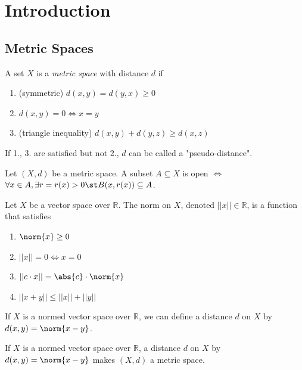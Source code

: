 \section{Introduction}
\subsection{Metric Spaces}

\begin{definition}
    A set $X$ is a \emph{metric space} with distance $d$ if 
    \begin{enumerate}
        \item (symmetric) $d(x, y) = d(y, x) \geq 0$
        \item $d(x, y) = 0 \iff x = y$
        \item (triangle inequality) $d(x,y) + d(y, z) \geq d(x, z)$
    \end{enumerate}
\end{definition}

\begin{remark}
    If 1., 3. are satisfied but not 2., $d$ can be called a "pseudo-distance".
\end{remark}

\begin{definition}
    Let $(X, d)$ be a metric space. A subset $A \subseteq X$ is open $\iff$ $\forall x \in A, \exists r = r(x )> 0 \st B(x, r(x)) \subseteq A$.
\end{definition}

\begin{definition}
    Let $X$ be a vector space over $\mathbb{R}$. The norm on $X$, denoted $||x|| \in \mathbb{R}$, is a function that satisfies 
    \begin{enumerate}
        \item $\norm{x} \geq 0$
        \item $||x|| = 0 \iff x = 0$
        \item $||c \cdot x|| = \abs{c} \cdot \norm{x}$
        \item $||x+y|| \leq ||x|| + ||y||$
    \end{enumerate}
    If $X$ is a normed vector space over $\mathbb{R}$, we can define a distance $d$ on $X$ by $d(x,y) = \norm{x - y}$.
\end{definition}

\begin{proposition}
    If $X$ is a normed vector space over $\mathbb{R}$, a distance $d$ on $X$ by $d(x,y) = \norm{x - y}$ makes $(X, d)$ a metric space.
\end{proposition}

